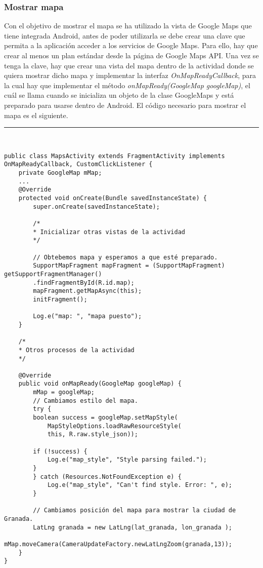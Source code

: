 \subsubsection{Mostrar mapa}
Con el objetivo de mostrar el mapa se ha utilizado la vista de Google Maps que tiene integrada Android, antes de poder utilizarla se debe crear una clave que  permita a la aplicación acceder a los servicios de Google Maps. Para ello, hay que crear al menos un plan estándar desde la página de Google Maps API. Una vez se tenga la clave, hay que crear una vista del mapa dentro de la actividad donde se quiera mostrar dicho mapa y implementar la interfaz \textit{OnMapReadyCallback}, para la cual hay que implementar el método \textit{onMapReady(GoogleMap googleMap)}, el cuál se llama cuando se inicializa un objeto de la clase GoogleMaps y está preparado para usarse dentro de Android. El código necesario para mostrar el mapa es el siguiente.
\newpage
\noindent\rule[-1ex]{\textwidth}{1pt}\\
\begin{lstlisting}[caption=código necesario para mostrar el mapa en la aplicación.]
public class MapsActivity extends FragmentActivity implements OnMapReadyCallback, CustomClickListener {
	private GoogleMap mMap;
	...
	@Override
	protected void onCreate(Bundle savedInstanceState) {
		super.onCreate(savedInstanceState);
		
		/*
		* Inicializar otras vistas de la actividad
		*/
		
		// Obtebemos mapa y esperamos a que esté preparado.
		SupportMapFragment mapFragment = (SupportMapFragment) getSupportFragmentManager()
		.findFragmentById(R.id.map);
		mapFragment.getMapAsync(this);
		initFragment();
		
		Log.e("map: ", "mapa puesto");
	}
	
	/*
	* Otros procesos de la actividad
	*/
	
	@Override
	public void onMapReady(GoogleMap googleMap) {
		mMap = googleMap;
		// Cambiamos estilo del mapa.
		try {
		boolean success = googleMap.setMapStyle(
			MapStyleOptions.loadRawResourceStyle(
			this, R.raw.style_json));
		
		if (!success) {
			Log.e("map_style", "Style parsing failed.");
		}
		} catch (Resources.NotFoundException e) {
			Log.e("map_style", "Can't find style. Error: ", e);
		}
		
		// Cambiamos posición del mapa para mostrar la ciudad de Granada.
		LatLng granada = new LatLng(lat_granada, lon_granada );
		mMap.moveCamera(CameraUpdateFactory.newLatLngZoom(granada,13));
	}
}
\end{lstlisting}
